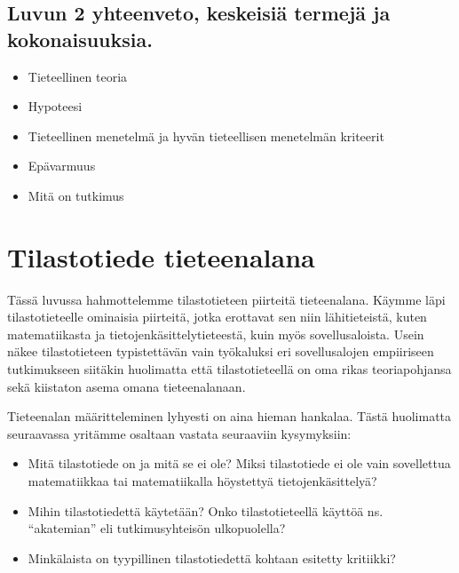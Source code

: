 \documentclass[
]{book}
\providecommand{\tightlist}{%
  \setlength{\itemsep}{0pt}\setlength{\parskip}{0pt}}
\begin{document}
\hypertarget{luvun-2-yhteenveto-keskeisiuxe4-termejuxe4-ja-kokonaisuuksia.}{%
\section{Luvun 2 yhteenveto, keskeisiä termejä ja kokonaisuuksia.}\label{luvun-2-yhteenveto-keskeisiuxe4-termejuxe4-ja-kokonaisuuksia.}}

\begin{itemize}
\tightlist
\item
  Tieteellinen teoria
\item
  Hypoteesi
\item
  Tieteellinen menetelmä ja hyvän tieteellisen menetelmän kriteerit
\item
  Epävarmuus
\item
  Mitä on tutkimus
\end{itemize}


\hypertarget{luku3}{%
\chapter{Tilastotiede tieteenalana}\label{luku3}}

Tässä luvussa hahmottelemme tilastotieteen piirteitä tieteenalana. Käymme läpi tilastotieteelle ominaisia piirteitä, jotka erottavat sen niin lähitieteistä, kuten matematiikasta ja tietojenkäsittelytieteestä, kuin myös sovellusaloista. Usein näkee tilastotieteen typistettävän vain työkaluksi eri sovellusalojen empiiriseen tutkimukseen siitäkin huolimatta että tilastotieteellä on oma rikas teoriapohjansa sekä kiistaton asema omana tieteenalanaan.

Tieteenalan määritteleminen lyhyesti on aina hieman hankalaa. Tästä huolimatta seuraavassa yritämme osaltaan vastata seuraaviin kysymyksiin:

\begin{itemize}
\tightlist
\item
  Mitä tilastotiede on ja mitä se ei ole? Miksi tilastotiede ei ole vain sovellettua matematiikkaa tai matematiikalla höystettyä tietojenkäsittelyä?
\item
  Mihin tilastotiedettä käytetään? Onko tilastotieteellä käyttöä ns. ``akatemian'' eli tutkimusyhteisön ulkopuolella?
\item
  Minkälaista on tyypillinen tilastotiedettä kohtaan esitetty kritiikki?
\end{itemize}
\end{document}

